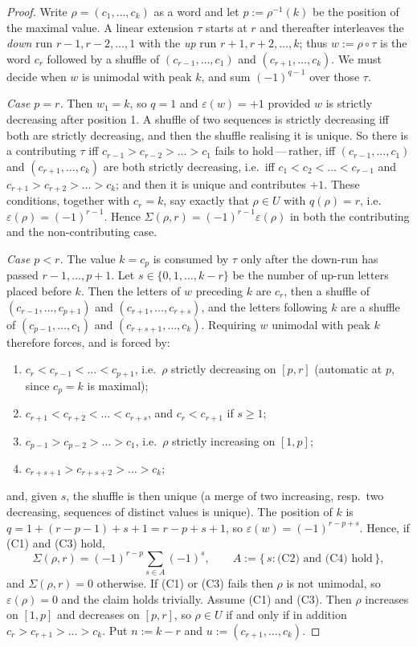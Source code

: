 \documentclass[11pt]{article}
\theoremstyle{definition}
\begin{document}
\begin{proof}
Write $\rho=(c_1,\dots,c_k)$ as a word and let $p:=\rho^{-1}(k)$ be the position of the
maximal value.  A linear extension $\tau$ starts at $r$ and thereafter interleaves the
\emph{down} run $r-1,r-2,\dots,1$ with the \emph{up} run $r+1,r+2,\dots,k$; thus
$w:=\rho\circ\tau$ is the word $c_r$ followed by a shuffle of
$(c_{r-1},\dots,c_1)$ and $(c_{r+1},\dots,c_k)$.  We must decide when $w$ is unimodal with
peak $k$, and sum $(-1)^{q-1}$ over those $\tau$.

\smallskip
\emph{Case $p=r$.}  Then $w_1=k$, so $q=1$ and $\varepsilon(w)=+1$ provided $w$ is strictly
decreasing after position 1.  A shuffle of two sequences is strictly decreasing iff both
are strictly decreasing, and then the shuffle realising it is unique.  So there is a
contributing $\tau$ iff $c_{r-1}>c_{r-2}>\dots>c_1$ fails to hold\,---\,rather, iff
$(c_{r-1},\dots,c_1)$ and $(c_{r+1},\dots,c_k)$ are both strictly decreasing, i.e.\ iff
$c_1<c_2<\dots<c_{r-1}$ and $c_{r+1}>c_{r+2}>\dots>c_k$; and then it is unique and
contributes $+1$.  These conditions, together with $c_r=k$, say exactly that $\rho\in U$
with $q(\rho)=r$, i.e.\ $\varepsilon(\rho)=(-1)^{r-1}$.  Hence
$\Sigma(\rho,r)=(-1)^{r-1}\varepsilon(\rho)$ in both the contributing and the
non-contributing case.

\smallskip
\emph{Case $p<r$.}  The value $k=c_p$ is consumed by $\tau$ only after the down-run has
passed $r-1,\dots,p+1$.  Let $s\in\{0,1,\dots,k-r\}$ be the number of up-run letters placed
before $k$.  Then the letters of $w$ preceding $k$ are $c_r$, then a shuffle of
$(c_{r-1},\dots,c_{p+1})$ and $(c_{r+1},\dots,c_{r+s})$, and the letters following $k$ are a
shuffle of $(c_{p-1},\dots,c_1)$ and $(c_{r+s+1},\dots,c_k)$.  Requiring $w$ unimodal with
peak $k$ therefore forces, and is forced by:
\begin{enumerate}
\item[(C1)] $c_r<c_{r-1}<\dots<c_{p+1}$, i.e.\ $\rho$ strictly decreasing on $[p,r]$
  (automatic at $p$, since $c_p=k$ is maximal);
\item[(C2)] $c_{r+1}<c_{r+2}<\dots<c_{r+s}$, and $c_r<c_{r+1}$ if $s\ge1$;
\item[(C3)] $c_{p-1}>c_{p-2}>\dots>c_1$, i.e.\ $\rho$ strictly increasing on $[1,p]$;
\item[(C4)] $c_{r+s+1}>c_{r+s+2}>\dots>c_k$;
\end{enumerate}
and, given $s$, the shuffle is then unique (a merge of two increasing, resp.\ two
decreasing, sequences of distinct values is unique).  The position of $k$ is
$q=1+(r-p-1)+s+1=r-p+s+1$, so $\varepsilon(w)=(-1)^{r-p+s}$.  Hence, if (C1) and (C3) hold,
\[
  \Sigma(\rho,r)=(-1)^{r-p}\sum_{s\in A}(-1)^{s},\qquad
  A:=\{\,s: \text{(C2) and (C4) hold}\,\},
\]
and $\Sigma(\rho,r)=0$ otherwise.  If (C1) or (C3) fails then $\rho$ is not unimodal, so
$\varepsilon(\rho)=0$ and the claim holds trivially.  Assume (C1) and (C3).  Then $\rho$
increases on $[1,p]$ and decreases on $[p,r]$, so $\rho\in U$ if and only if in addition
$c_r>c_{r+1}>\dots>c_k$.  Put $n:=k-r$ and $u:=(c_{r+1},\dots,c_k)$.


\end{proof}
\end{document}
